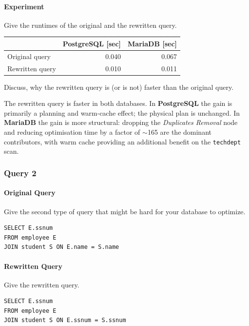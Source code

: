 \documentclass[11pt]{scrartcl}
\begin{document}
\paragraph{Experiment}

Give the runtimes of the original and the rewritten query.

\begin{table}[H]
  \centering
  \begin{tabular}{l|r|r}
    & PostgreSQL [sec] & MariaDB [sec] \tabularnewline
    \hline
    Original query  & 0.040 & 0.067 \tabularnewline
    Rewritten query & 0.010 & 0.011 \tabularnewline
  \end{tabular}
\end{table}

Discuss, why the rewritten query is (or is not) faster than the original query.

The rewritten query is faster in both databases. In \textbf{PostgreSQL} the gain is primarily a planning and warm-cache effect; the physical plan is unchanged. In \textbf{MariaDB} the gain is more structural: dropping the \textit{Duplicates Removal} node and reducing optimisation time by a factor of $\sim$165 are the dominant contributors, with warm cache providing an additional benefit on the \texttt{techdept} scan.

\subsubsection*{Query 2}

\paragraph{Original Query}

Give the second type of query that might be hard for your database to optimize.

\begin{lstlisting}[style=dbtsql]
SELECT E.ssnum 
FROM employee E 
JOIN student S ON E.name = S.name
\end{lstlisting}

\paragraph{Rewritten Query}

Give the rewritten query.

\begin{lstlisting}[style=dbtsql]
SELECT E.ssnum 
FROM employee E 
JOIN student S ON E.ssnum = S.ssnum
\end{lstlisting}
\end{document}
